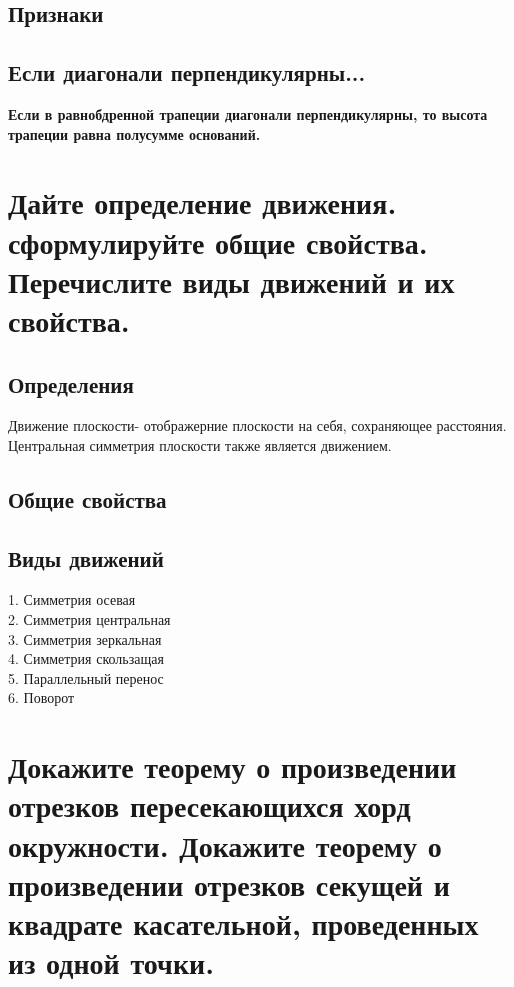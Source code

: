 \documentclass[12pt, letterpaper]{article}
\begin{document}
\subsection{Признаки}
\subsection{Если  диагонали перпендикулярны...}
\textbf{Если в равнобдренной трапеции диагонали перпендикулярны, то высота трапеции равна полусумме оснований.}

\section {Дайте определение движения. сформулируйте общие свойства. Перечислите виды движений и их свойства.}
\subsection{Определения}
Движение плоскости- отображерние плоскости на себя, сохраняющее расстояния. \\
Центральная симметрия плоскости также является движением. \\
\subsection{Общие свойства}

\subsection{Виды движений}
1. Симметрия осевая \\
2. Симметрия центральная \\
3. Симметрия зеркальная \\
4. Симметрия скользащая \\
5. Параллельный перенос \\
6. Поворот \\




\section {Докажите теорему о произведении отрезков пересекающихся хорд окружности. Докажите теорему о произведении отрезков секущей и квадрате касательной, проведенных из одной точки.}
\end{document}
